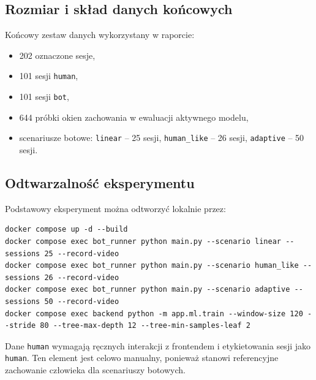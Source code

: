 \subsection{Rozmiar i skład danych końcowych}
Końcowy zestaw danych wykorzystany w raporcie:
\begin{itemize}
  \item 202 oznaczone sesje,
  \item 101 sesji \texttt{human},
  \item 101 sesji \texttt{bot},
  \item 644 próbki okien zachowania w ewaluacji aktywnego modelu,
  \item scenariusze botowe: \texttt{linear} -- 25 sesji,
  \texttt{human\_like} -- 26 sesji, \texttt{adaptive} -- 50 sesji.
\end{itemize}

\subsection{Odtwarzalność eksperymentu}
Podstawowy eksperyment można odtworzyć lokalnie przez:
\begin{lstlisting}[style=reportcode]
docker compose up -d --build
docker compose exec bot_runner python main.py --scenario linear --sessions 25 --record-video
docker compose exec bot_runner python main.py --scenario human_like --sessions 26 --record-video
docker compose exec bot_runner python main.py --scenario adaptive --sessions 50 --record-video
docker compose exec backend python -m app.ml.train --window-size 120 --stride 80 --tree-max-depth 12 --tree-min-samples-leaf 2
\end{lstlisting}

Dane \texttt{human} wymagają ręcznych interakcji z frontendem i etykietowania
sesji jako \texttt{human}. Ten element jest celowo manualny, ponieważ stanowi
referencyjne zachowanie człowieka dla scenariuszy botowych.
